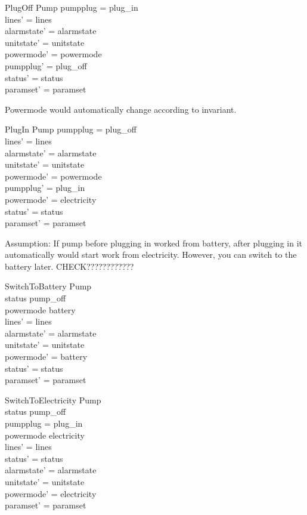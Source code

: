 \documentclass{article}
\begin{document}
	
	\begin{schema}{PlugOff}
		\Delta Pump		
	\where
		pumpplug = plug\_in \\		
		lines' = lines  \\
    	alarmstate' = alarmstate \\
    	unitstate' = unitstate \\
    	powermode' = powermode \\
    	pumpplug' = plug\_off \\
    	status' = status \\		
		paramset' = paramset		
	\end{schema}
	Powermode would automatically change according to invariant.
	\begin{schema}{PlugIn}
		\Delta Pump 
	\where
		pumpplug = plug\_off \\
		lines' = lines  \\
    	alarmstate' = alarmstate \\
    	unitstate' = unitstate \\
    	powermode' = powermode \\
    	pumpplug' = plug\_in \\
    	powermode' = electricity \\
		status' = status \\
		paramset' = paramset		
	\end{schema}
    Assumption: If pump before plugging in worked from battery, after plugging in it automatically would start work from electricity. However, you can switch to the battery later. CHECK????????????	
	\begin{schema}{SwitchToBattery}
		\Delta Pump \\
	\where 
		status \neq pump\_off \\
		powermode \neq battery\\
		lines' = lines \\
		alarmstate' = alarmstate \\
		unitstate' = unitstate \\
		powermode' = battery \\
		status' = status \\
		paramset' = paramset \\
	\end{schema}
	
	\begin{schema}{SwitchToElectricity}
		\Delta Pump \\
	\where 
		status \neq pump\_off \\
		pumpplug = plug\_in \\
		powermode \neq electricity \\
		lines' = lines \\
		status' = status \\
		alarmstate' = alarmstate \\
		unitstate' = unitstate \\
		powermode' = electricity \\
		paramset' = paramset \\
	\end{schema}
	
\end{document}
